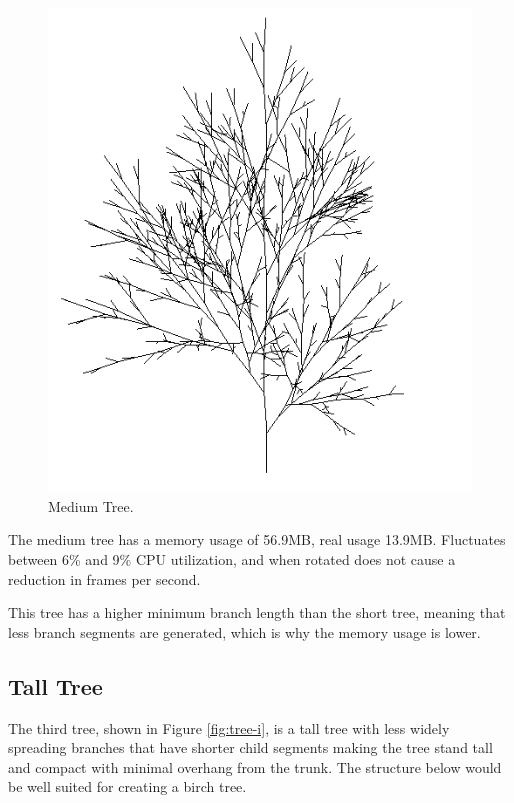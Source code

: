 \documentclass[final]{cmpreport}
\begin{document}
\begin{figure}[ht]
    \includegraphics[scale=0.7]{tree-h.PNG} 
    \centering
    \captionsetup{justification=centering}
    \caption{Medium Tree.}
    \label{fig:tree-h}
\end{figure}

The medium tree has a memory usage of 56.9MB, real usage 13.9MB. Fluctuates between 6\% and 
9\% CPU utilization, and when rotated does not cause a reduction in frames per second.

This tree has a higher minimum branch length than the short tree, meaning that less branch 
segments are generated, which is why the memory usage is lower.

\pagebreak
\subsection{Tall Tree}
The third tree, shown in Figure \ref{fig:tree-i}, is a tall tree with less widely spreading 
branches that have shorter child segments making the tree stand tall and compact with minimal 
overhang from the trunk. The structure below would be well suited for creating a birch tree.
\end{document}
